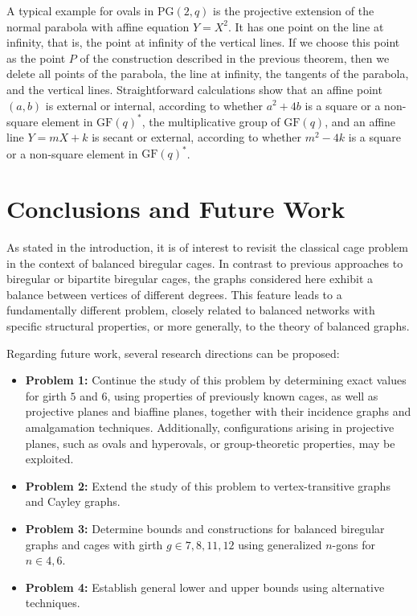 \documentclass[a4paper,11pt]{article}
\begin{document}
A typical example for ovals in $\mathrm{PG}(2,q)$ is the projective extension of the normal parabola with affine equation $Y=X^2$. It has one point on the line at infinity, that is, the point at infinity of the vertical lines. If we choose this point as the point $P$ of the construction described in the previous theorem, then we delete all points of the parabola, the line at infinity, the tangents of the parabola, and the vertical lines. Straightforward calculations show that an affine point $(a,b)$ is external or internal,
according to whether $a^2+4b$ is a square or a non-square element  in  $\mathrm{GF}(q)^*$,
the multiplicative group of $\mathrm{GF}(q)$, and an affine line $Y=mX+k$ is secant or external, according to whether $m^2-4k$ is a square or a non-square element in $\mathrm{GF}(q)^*$.
 
\section{Conclusions and Future Work}\label{conclandfuturework}
As stated in the introduction, it is of interest to revisit the classical cage problem in the context of balanced biregular cages. In contrast to previous approaches to biregular or bipartite biregular cages, the graphs considered here exhibit a balance between vertices of different degrees. This feature leads to a fundamentally different problem, closely related to balanced networks with specific structural properties, or more generally, to the theory of balanced graphs.

\medskip
Regarding future work, several research directions can be proposed:

\begin{itemize}
\item {\bf{Problem 1:}} Continue the study of this problem by determining exact values for girth $5$ and $6$, using properties of previously known cages, as well as projective planes and biaffine planes, together with their incidence graphs and amalgamation techniques. 
Additionally, configurations arising in projective planes, such as ovals and hyperovals, or group-theoretic properties, may be exploited.

\item {\bf{Problem 2:}} Extend the study of this problem to vertex-transitive graphs and Cayley graphs.

\item {\bf{Problem 3:}} Determine bounds and constructions for balanced biregular graphs and cages with girth $g \in {7,8,11,12}$ using generalized $n$-gons for $n \in {4,6}$.

\item {\bf{Problem 4:}} Establish general lower and upper bounds using alternative techniques.

\end{itemize}
\end{document}
